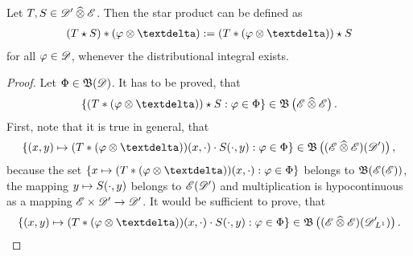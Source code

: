 \begin{theorem}
    Let $ T,S \in \mathscr{  D  }' \mathbin{\widehat{\otimes}} \mathscr{  E  } $.
    Then the star product can be defined as
    \begin{align}
        ( T \star S ) * ( \ph \tepro \sfdeo )
        :=
        ( T * ( \ph \tepro \sfdeo ) ) \star S
    \end{align}
    for all $ \varphi \in \mathscr{  D  } $,
    whenever the distributional integral exists.
\end{theorem}
\begin{proof}
    Let $ \Phi \in \operatorname{\mathfrak{ B }}(\mathscr{  D  }) $.
    It has to be proved, that
    \begin{align}
        \BrmSet{ ( T * ( \ph \tepro \sfdeo ) ) \star S }{ \ph \in \Ph }
        \in
        \ssBnd\left( \fsSmo \ctepro \fsSmo \right)
        .
    \end{align}
    First, note that it is true in general, that
    \begin{align}
        \BrmSet{ (x,y) \mto ( T * ( \ph \tepro \sfdeo ) )(x,\cdot) \mult S(\cdot,y) }
        { \ph \in \Ph }
        \in
        \ssBnd\left( ( \fsSmo \ctepro \fsSmo )( \fsDis ) \right)
        ,
    \end{align}
    because the set $ \BrmSet{ x \mto ( T * ( \ph \tepro \sfdeo ) )(x,\cdot) }{ \ph \in \Ph } $
    belongs to $ \operatorname{\mathfrak{ B }}( \mathscr{  E  }( \mathscr{  E  } ) ) $,
    the mapping $ y \mapsto S(\cdot,y) $ belongs to $ \mathscr{  E  }( \mathscr{  D  }' ) $ and
    multiplication is hypocontinuous as a mapping $ \mathscr{  E  } \times \mathscr{  D  }' \to \mathscr{  D  }' $.
    It would be sufficient to prove, that
    \begin{align}
        \BrmSet{ (x,y) \mto ( T * ( \ph \tepro \sfdeo ) )(x,\cdot) \mult S(\cdot,y) }
        { \ph \in \Ph }
        \in
        \ssBnd\left( ( \fsSmo \ctepro \fsSmo )( \fsDisint ) \right)
        .
    \end{align}
\end{proof}


